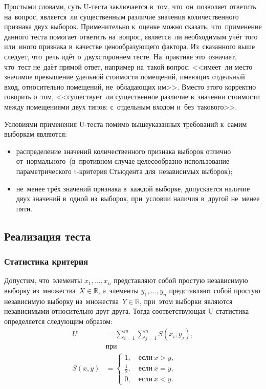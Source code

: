 \documentclass[]{scrartcl}
\begin{document}
Простыми словами, суть U-теста заключается в~том, что~он~позволяет ответить на~вопрос, является~ли существенным различие значения количественного признака двух выборок. Применительно к~оценке можно сказать, что~применение данного теста помогает ответить на~вопрос, является~ли необходимым учёт того или~иного признака в~качестве ценообразующего фактора. Из~сказанного выше следует, что~речь идёт о~двухстороннем тесте. На~практике это~означает, что~тест не~даёт прямой ответ, например на~такой вопрос: <<имеет~ли место значимое превышение удельной стоимости помещений, имеющих отдельный вход, относительно помещений, не~обладающих им>>. Вместо этого корректно говорить о~том, <<существует~ли существенное различие в~значении стоимости между помещениями двух типов: с~отдельным входом и~без~такового>>.

Условиями применения U-теста помимо вышеуказанных требований к~самим выборкам являются:
\begin{itemize}
	\item распределение значений количественного признака выборок отлично от~нормального~(в~противном случае целесообразно использование параметрического t-критерия Стьюдента для~независимых выборок);
	\item не~менее трёх значений признака в~каждой выборке, допускается наличие двух значений в~одной из~выборок, при~условии наличия в~другой не~менее пяти.
	\end{itemize}

\subsection{Реализация теста}
\subsubsection{Статистика критерия}
Допустим, что~элементы ${\textstyle x_{1},\ldots,x_{n}}$ представляют собой простую независимую выборку из~множества~${\textstyle X \in \mathbb{R}}$, а~элементы ${\textstyle y_{1},\ldots,y_{n}}$ представляют собой простую независимую выборку из~множества~${\textstyle Y \in \mathbb{R}}$, при~этом выборки являются независимыми относительно друг друга. Тогда соответствующая U-статистика определяется следующим образом:
\begin{equation}\label{eq:U-statistic-base-formula}
	\begin{aligned}
	U&=\sum_{i=1}^{m} \sum_{j=1}^{n} S (x_{i},y_{j}),\\
	&\text{при}\\
	S(x,y)&=
	\begin{cases}
	1,\quad \text{если}\ x>y,\\
	\frac{1}{2},\quad \text{если}\ x=y,\\
	0,\quad \text{если}\ x<y.
	\end{cases}
	\end{aligned}
\end{equation}
\end{document}
